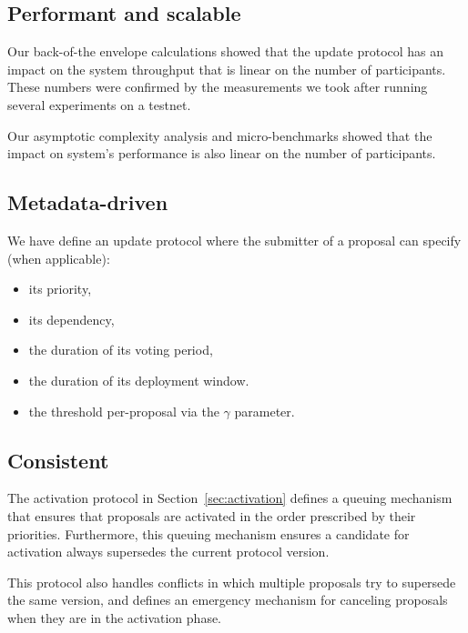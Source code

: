 \documentclass[11pt,a4paper]{article}
\begin{document}
%
%
%

\subsection{Performant and scalable}
\label{sec:sat-performant-scalable}

Our back-of-the envelope calculations showed that the update protocol has an
impact on the system throughput that is linear on the number of participants.
These numbers were confirmed by the measurements we took after running several
experiments on a testnet.

Our asymptotic complexity analysis and micro-benchmarks showed that the impact
on system's performance is also linear on the number of participants.

\subsection{Metadata-driven}
\label{sec:sat-metadata-driven}

We have define an update protocol where the submitter of a proposal can specify
(when applicable):
\begin{itemize}
\item its priority,
\item its dependency,
\item the duration of its voting period,
\item the duration of its deployment window.
\item the threshold per-proposal via the $\gamma$ parameter.
\end{itemize}

\subsection{Consistent}
\label{sec:sat-cons-update-logic}

The activation protocol in Section~\ref{sec:activation} defines a queuing
mechanism that ensures that proposals are activated in the order prescribed by
their priorities. Furthermore, this queuing mechanism ensures a candidate
for activation always supersedes the current protocol version.

This protocol also handles conflicts in which multiple proposals try to
supersede the same version, and defines an emergency mechanism for canceling
proposals when they are in the activation phase.
\end{document}
